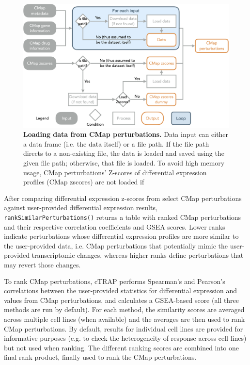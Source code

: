 \begin{figure}[!h]
  \includegraphics[width=.8\textwidth]{images/ctrap/cmap-perturbations}
  \centering
  \caption[Loading data from CMap perturbations]{\textbf{Loading data from CMap perturbations.} Data input can either a data frame (i.e. the data itself) or a file path. If the file path directs to a non-existing file, the data is loaded and saved using the given file path; otherwise, that file is loaded. To avoid high memory usage, CMap perturbations' Z-scores of differential expression profiles (CMap zscores) are not loaded if }
  \label{fig:ctrap-cmap-perturbations}
\end{figure}

After comparing differential expression z-scores from select CMap perturbations against user-provided differential expression results, \texttt{rankSimilarPerturbations()} returns a table with ranked CMap perturbations and their respective correlation coefficients and GSEA scores. Lower ranks indicate perturbations whose differential expression profiles are more similar to the user-provided data, i.e. CMap perturbations that potentially mimic the user-provided transcriptomic changes, whereas higher ranks define perturbations that may revert those changes.

To rank CMap perturbations, cTRAP performs Spearman's and Pearson's correlations between the user-provided statistics for differential expression and values from CMap perturbations, and calculates a GSEA-based score (all three methods are run by default). For each method, the similarity scores are averaged across multiple cell lines (when available) and the averages are then used to rank CMap perturbations. By default, results for individual cell lines are provided for informative purposes (e.g. to check the heterogeneity of response across cell lines) but not used when ranking. The different ranking scores are combined into one final rank product, finally used to rank the CMap perturbations.


